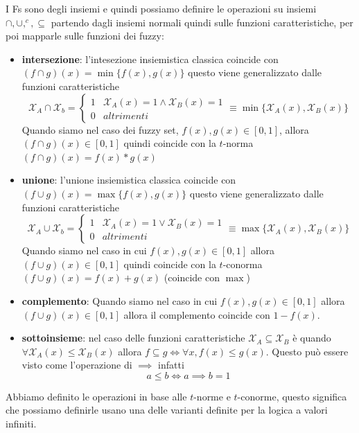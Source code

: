 I Fs sono degli insiemi e quindi possiamo definire le operazioni su insiemi $\cap, \cup, ^c, \subseteq$ 
partendo dagli insiemi normali quindi sulle funzioni caratteristiche, per poi 
mapparle sulle funzioni dei fuzzy:
\begin{itemize}
    \item \textbf{intersezione}: l'intesezione insiemistica classica 
    coincide con $(f\cap g)(x) = \min\{f(x), g(x)\}$ questo viene generalizzato dalle funzioni
    caratteristiche
    $$\mathcal{X}_A\cap \mathcal{X}_b = \begin{cases}
        1& \mathcal{X}_A(x) = 1\land \mathcal{X}_B(x)=1\\
        0& altrimenti
    \end{cases} \equiv 
    \min\{\mathcal{X}_A(x), \mathcal{X}_B(x)\}$$
    Quando siamo nel caso dei fuzzy set, $f(x), g(x) \in [0,1]$, allora $(f\cap g)(x)\in [0,1]$
    quindi coincide con la $t$-norma $(f\cap g)(x)= f(x) \ast g(x)$
    \item \textbf{unione}: l'unione insiemistica classica 
    coincide con $(f\cup g)(x) = \max\{f(x), g(x)\}$ questo viene generalizzato dalle funzioni
    caratteristiche
    $$\mathcal{X}_A\cup \mathcal{X}_b = \begin{cases}
        1& \mathcal{X}_A(x) = 1\lor \mathcal{X}_B(x)=1\\
        0& altrimenti
    \end{cases} \equiv 
    \max\{\mathcal{X}_A(x), \mathcal{X}_B(x)\}$$
    Quando siamo nel caso in cui $f(x), g(x) \in [0,1]$ allora $(f\cup g)(x)\in [0,1]$
    quindi coincide con la $t$-conorma $(f\cup g)(x)= f(x) + g(x)$ (coincide con $\max$)
    \item \textbf{complemento}: Quando siamo nel caso in cui $f(x), g(x) \in [0,1]$ allora $(f\cup g)(x)\in [0,1]$
    allora il complemento coincide con $1-f(x)$.
    \item \textbf{sottoinsieme}: nel caso delle funzioni caratteristiche 
     $\mathcal{X}_A\subseteq \mathcal{X}_B$
    è quando $\forall \mathcal{X}_A(x) \le \mathcal{X}_B(x)$ allora $f\subseteq g \iff \forall x, f(x)\le g(x)$.
    Questo può essere visto come l'operazione di $\implies$ infatti
    $$a\le b \iff a\implies b = 1$$

\end{itemize}

Abbiamo definito le operazioni in base alle $t$-norme e $t$-conorme, questo significa 
che possiamo definirle usano una delle varianti definite per la logica a valori 
infiniti.

